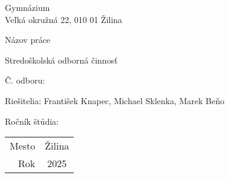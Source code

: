 \documentclass[12pt]{article}
\begin{document}
%
%
\begin{titlepage}
    \setlength{\parindent}{0pt}

    \begin{center}
        Gymnázium \\
        Veľká okružná 22, 010 01 Žilina

        \vspace{7cm}
        \Huge Názov práce

        \vspace{1.13cm}
        \Large Stredoškolská odborná činnosť

        \vspace{2.12cm}
        \normalsize Č. odboru:
    \end{center}

    \vfill

    \begin{minipage}{0.75\textwidth}
        Riešitelia: František Knapec, Michael Sklenka, Marek Beňo \par
        Ročník štúdia:
    \end{minipage}
    \hfill
    \begin{minipage}{0.2\textwidth}
        \hfil %
        \begin{tabular}{r@{: }c}
            Mesto & Žilina \\
            Rok   & 2025
        \end{tabular}
    \end{minipage}
\end{titlepage}
\end{document}
